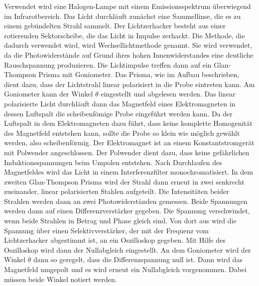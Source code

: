 Verwendet wird eine Halogen-Lampe mit einem Emissionsspektrum überwiegend
im Infrarotbereich.
Das Licht durchläuft zunächst eine Sammellinse, die es zu einem gebündelten
Strahl sammelt. Der Lichtzerhacker besteht aus einer rotierenden Sektorscheibe,
die das Licht in Impulse zerhackt. Die Methode, die dadurch verwendet wird, wird
Wechsellichtmethode genannt. Sie wird verwendet, da die Photowiderstände auf
Grund ihres hohen Innenwiderstandes eine deutliche Rauschspannung produzieren.
Die Lichtimpulse treffen dann auf ein Glan-Thompson Prisma mit Goniometer. Das
Prisma, wie im Aufbau beschrieben, dient dazu, dass der Lichtstrahl linear
polarisiert in die Probe eintreten kann. Am Goniometer kann der Winkel $\theta$
eingestellt und abgelesen werden. Das linear polarisierte Licht durchläuft dann
das Magnetfeld eines Elektromagneten in dessen Luftspalt die scheibenfömige
Probe eingeführt werden kann. Da der Luftspalt in dem Elektromagneten dazu führt,
dass keine komplette Homogenität des Magnetfeld entstehen kann, sollte die
Probe so klein wie möglich gewählt werden, also scheibenförmig. Der Elektromagnet
ist an einem Konstantstromgerät mit Polwender angeschlossen. Der Polwender dient
dazu, dass keine gefährlichen Induktionsspannungen beim Umpolen entstehen.
Nach Durchlaufen des Magnetfeldes wird das Licht in einem Interferenzfilter
monochromatisiert. In dem zweiten Glan-Thompson Prisma wird der Strahl dann
erneut in zwei senkrecht zueinander, linear polarisierten Stahlen aufgeteilt. Die
Intensitäten beider Strahlen werden dann an zwei Photowiderständen gemessen.
Beide Spannungen werden dann auf einen Differenzverstärker gegeben. Die Spannung
verschwindet, wenn beide Strahlen in Betrag und Phase gleich sind. Von dort aus
wird die Spannung über einen Selektivverstärker, der mit der Frequenz vom
Lichtzerhacker abgestimmt ist, an ein Oszilloskop gegeben. Mit Hilfe des
Oszilloskop wird dann der Nullabgleich eingestellt. An dem Goniometer wird der
Winkel $\theta$ dann so geregelt, dass die Differenzspannung null ist. Dann wird
das Magnetfeld umgepolt und es wird erneut ein Nullabgleich vorgenommen. Dabei
müssen beide Winkel notiert werden.

